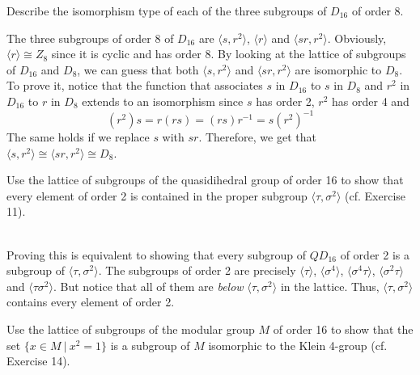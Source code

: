 \begin{exercise}
    Describe the isomorphism type of each of the three subgroups of $D_{16}$ of order 8. \\
\end{exercise}

\begin{solution}
    The three subgroups of order 8 of $D_{16}$ are $\langle s, r^2 \rangle$, $\langle r \rangle$ and $\langle sr, r^2 \rangle$. Obviously, $\langle r \rangle \cong Z_8$ since it is cyclic and has order 8. By looking at the lattice of subgroups of $D_{16}$ and $D_8$, we can guess that both $\langle s, r^2 \rangle$ and $\langle sr, r^2 \rangle$ are isomorphic to $D_8$. To prove it, notice that the function that associates $s$ in $D_{16}$ to $s$ in $D_8$ and $r^2$ in $D_{16}$ to $r$ in $D_8$ extends to an isomorphism since $s$ has order 2, $r^2$ has order 4 and 
    $$(r^2)s = r(rs) = (rs)r^{-1} = s(r^2)^{-1}$$
    The same holds if we replace $s$ with $sr$. Therefore, we get that $\langle s, r^2 \rangle \cong \langle sr, r^2 \rangle \cong D_8$. \\
\end{solution}

\begin{exercise}
    Use the lattice of subgroups of the quasidihedral group of order 16 to show that every element of order 2 is contained in the proper subgroup $\langle \tau, \sigma^2 \rangle$ (cf. Exercise 11). \\
\end{exercise}

\begin{solution}
    \\ Proving this is equivalent to showing that every subgroup of $QD_{16}$ of order 2 is a subgroup of $\langle \tau, \sigma^2 \rangle$. The subgroups of order 2 are precisely $\langle \tau \rangle$, $\langle \sigma^4 \rangle$, $\langle \sigma^4\tau \rangle$, $\langle \sigma^2\tau \rangle$ and $\langle \tau\sigma^2 \rangle$. But notice that all of them are \textit{below} $\langle \tau, \sigma^2 \rangle$ in the lattice. Thus, $\langle \tau, \sigma^2 \rangle$ contains every element of order 2. \\
\end{solution}

\begin{exercise}
    Use the lattice of subgroups of the modular group $M$ of order 16 to show that the set $\{x\in M \ | \ x^2 = 1\}$ is a subgroup of $M$ isomorphic to the Klein 4-group (cf. Exercise 14). \\
\end{exercise}

